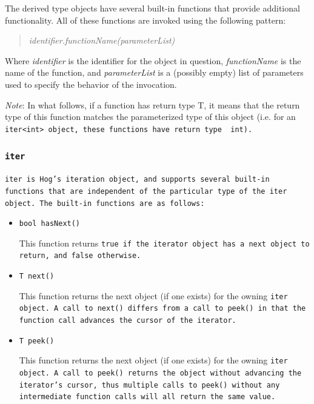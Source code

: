 \documentclass{report}
\begin{document}
The derived type objects have several built-in functions that provide
additional functionality. All of these functions are invoked using the
following pattern:

\begin{quotation}
\emph{identifier.functionName(parameterList)}
\end{quotation}

\noindent Where \emph{identifier} is the identifier for the object in question,
\emph{functionName} is the name of the function, and \emph{parameterList} is a
(possibly empty) list of parameters used to specify the behavior of the
invocation.

\emph{Note}: In what follows, if a function has return type T, it means that
the return type of this function matches the parameterized type of this object
(i.e. for an \tt iter<int> \rm object, these functions have return type \tt
int\rm).

\subsubsection{\tt iter \rm} %
\label{ssub:iter}

\tt iter \rm is Hog's iteration object, and supports several built-in functions
that are independent of the particular type of the \tt iter \rm object. The
built-in functions are as follows:

\begin{itemize}

\item[] \tt bool hasNext() \rm

This function returns \tt true \rm if the iterator object has a next object
to return, and \tt false \rm otherwise.

\item[] \tt T next() \rm

This function returns the next object (if one exists) for the owning \tt iter \rm
object. A call to \tt next() \rm differs from a call to \tt peek() \rm in that the
function call advances the cursor of the iterator.

\item[] \tt T peek() \rm

This function returns the next object (if one exists) for the owning \tt iter
\rm object. A call to \tt peek() \rm returns the object without advancing the
iterator's cursor, thus multiple calls to \tt peek() \rm without any
intermediate function calls will all return the same value.

\end{itemize} 
\end{document}
